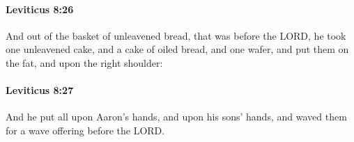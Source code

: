 		\paragraph{Leviticus 8:26} %
			\label{LEVITICUS-8-26}

			And out of the basket of unleavened bread, that was before the LORD, he took one unleavened cake, and a cake of oiled bread, and one wafer, and put them on the fat, and upon the right shoulder:


		\paragraph{Leviticus 8:27} %
			\label{LEVITICUS-8-27}

			And he put all upon Aaron’s hands, and upon his sons’ hands, and waved them for a wave offering before the LORD.


